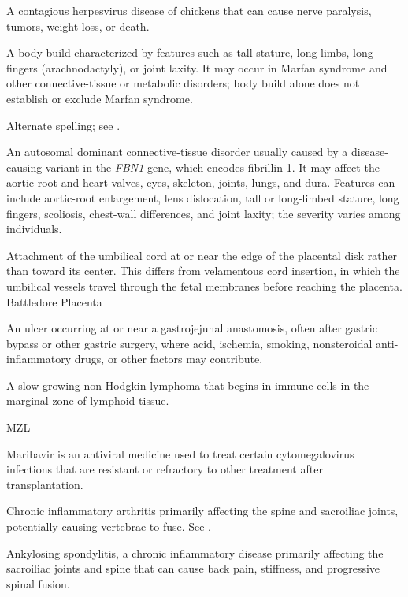  A contagious herpesvirus disease of chickens that can cause nerve paralysis, tumors, weight loss, or death.

 A body build characterized by features such as tall stature, long limbs, long fingers (arachnodactyly), or joint laxity. It may occur in Marfan syndrome and other connective-tissue or metabolic disorders; body build alone does not establish or exclude Marfan syndrome.

 Alternate spelling; see .

 An autosomal dominant connective-tissue disorder usually caused by a disease-causing variant in the \textit{FBN1} gene, which encodes fibrillin-1. It may affect the aortic root and heart valves, eyes, skeleton, joints, lungs, and dura. Features can include aortic-root enlargement, lens dislocation, tall or long-limbed stature, long fingers, scoliosis, chest-wall differences, and joint laxity; the severity varies among individuals.

 Attachment of the umbilical cord at or near the edge of the placental disk rather than toward its center.
This differs from velamentous cord insertion, in which the umbilical vessels travel through
the fetal membranes before reaching the placenta.
\synonyms
Battledore Placenta

 An ulcer occurring at or near a gastrojejunal anastomosis, often after gastric bypass or other gastric surgery, where acid, ischemia, smoking, nonsteroidal anti-inflammatory drugs, or other factors may contribute.

 A slow-growing non-Hodgkin lymphoma that begins in immune cells in the marginal zone of lymphoid tissue.

\synonyms
MZL

 Maribavir is an antiviral medicine used to treat certain cytomegalovirus infections that are resistant or refractory to other treatment after transplantation.

 Chronic inflammatory arthritis primarily affecting the spine and sacroiliac joints, potentially causing vertebrae to fuse. See .

 Ankylosing spondylitis, a chronic inflammatory disease primarily affecting the sacroiliac joints and spine that can cause back pain, stiffness, and progressive spinal fusion.

